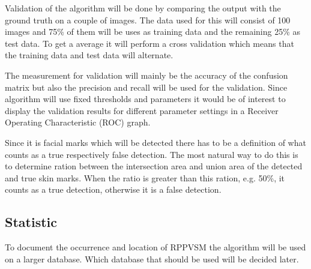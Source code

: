 Validation of the algorithm will be done by comparing the output with the ground truth on a couple of images. The data used for this will consist of 100 images and 75\% of them will be uses as training data and the remaining 25\% as test data. To get a average it will perform a cross validation which means that the training data and test data will alternate. 

The measurement for validation will mainly be the accuracy of the confusion matrix but also the precision and recall will be used for the validation. Since algorithm will use fixed thresholds and parameters it would be of interest to display the validation results for different parameter settings in a Receiver Operating Characteristic (ROC) graph.

Since it is facial marks which will be detected there has to be a definition of what counts as a true respectively false detection. The most natural way to do this is to determine ration between the intersection area and union area of the detected and true skin marks. When the ratio is greater than this ration, e.g. 50\%, it counts as a true detection, otherwise it is a false detection. 


\subsection{Statistic}

To document the occurrence and location of RPPVSM the algorithm will be used on a larger database. Which database that should be used will be decided later.     
